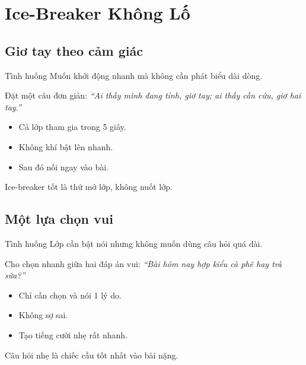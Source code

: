 \chapter{Ice-Breaker Không Lố}

\section{Giơ tay theo cảm giác}
\begin{tinhhuong}{Tình huống}
Muốn khởi động nhanh mà không cần phát biểu dài dòng.
\end{tinhhuong}
\begin{goiydungngay}
Đặt một câu đơn giản: \textit{``Ai thấy mình đang tỉnh, giơ tay; ai thấy cần cứu, giơ hai tay.''}
\begin{itemize}
\item Cả lớp tham gia trong 5 giây.
\item Không khí bật lên nhanh.
\item Sau đó nối ngay vào bài.
\end{itemize}
\end{goiydungngay}
\begin{cauchot}
Ice-breaker tốt là thứ mở lớp, không nuốt lớp.
\end{cauchot}
\ngancach

\section{Một lựa chọn vui}
\begin{tinhhuong}{Tình huống}
Lớp cần bật nói nhưng không muốn dùng câu hỏi quá dài.
\end{tinhhuong}
\begin{goiydungngay}
Cho chọn nhanh giữa hai đáp án vui: \textit{``Bài hôm nay hợp kiểu cà phê hay trà sữa?''}
\begin{itemize}
\item Chỉ cần chọn và nói 1 lý do.
\item Không sợ sai.
\item Tạo tiếng cười nhẹ rất nhanh.
\end{itemize}
\end{goiydungngay}
\begin{cauchot}
Câu hỏi nhẹ là chiếc cầu tốt nhất vào bài nặng.
\end{cauchot}
\ngancach

